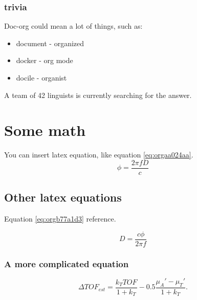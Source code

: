 \subsubsection{trivia}
\label{sec:org47d2622}
Doc-org could mean a lot of things, such as:
\begin{itemize}
\item document - organized
\item docker - org mode
\item docile - organist
\end{itemize}
A team of 42 linguists is currently searching for the answer.

\section{Some math}
\label{sec:org0c04387}
You can insert latex equation, like equation \ref{eq:orgaa024aa}.
\begin{equation}
\label{eq:orgaa024aa}
\phi = \frac{2\pi fD}{c}
\end{equation}
\subsection{Other latex equations}
\label{sec:orge1e5510}
Equation \ref{eq:orgb77a1d3} reference.

\begin{equation}
\label{eq:orgb77a1d3}
D = \frac{c\phi}{2\pi f}
\end{equation}

\subsubsection{A more complicated equation}
\label{sec:org96269e0}

\begin{equation}
\Delta TOF_{est} = \frac{k_T TOF}{1+k_T } - 0.5 \frac{\mu_A' - \mu_T'}{1+k_T}.
\end{equation}


